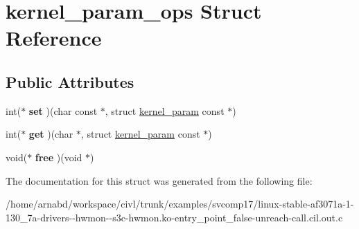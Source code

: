 \hypertarget{structkernel__param__ops}{}\section{kernel\+\_\+param\+\_\+ops Struct Reference}
\label{structkernel__param__ops}
\subsection*{Public Attributes}
\begin{DoxyCompactItemize}
\item 
\hypertarget{structkernel__param__ops_a99268b241471662344c4c880f604922e}{}int($\ast$ {\bfseries set} )(char const $\ast$, struct \hyperlink{structkernel__param}{kernel\+\_\+param} const $\ast$)\label{structkernel__param__ops_a99268b241471662344c4c880f604922e}

\item 
\hypertarget{structkernel__param__ops_a7310c74d68de203bd6911475303f3465}{}int($\ast$ {\bfseries get} )(char $\ast$, struct \hyperlink{structkernel__param}{kernel\+\_\+param} const $\ast$)\label{structkernel__param__ops_a7310c74d68de203bd6911475303f3465}

\item 
\hypertarget{structkernel__param__ops_a8f41a4997c5f3f709008a5466c613eb9}{}void($\ast$ {\bfseries free} )(void $\ast$)\label{structkernel__param__ops_a8f41a4997c5f3f709008a5466c613eb9}

\end{DoxyCompactItemize}


The documentation for this struct was generated from the following file\+:\begin{DoxyCompactItemize}
\item 
/home/arnabd/workspace/civl/trunk/examples/svcomp17/linux-\/stable-\/af3071a-\/1-\/130\+\_\+7a-\/drivers-\/-\/hwmon-\/-\/s3c-\/hwmon.\+ko-\/entry\+\_\+point\+\_\+false-\/unreach-\/call.\+cil.\+out.\+c\end{DoxyCompactItemize}
